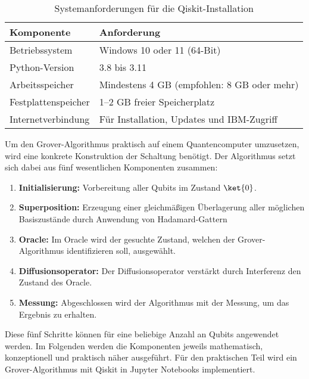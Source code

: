\begin{table}[ht!]
\centering
\begin{tabularx}{\textwidth}{|l|X|}
\hline
\textbf{Komponente} & \textbf{Anforderung} \\
\hline
Betriebssystem & Windows 10 oder 11 (64-Bit) \\
\hline
Python-Version & 3.8 bis 3.11 \\
\hline
Arbeitsspeicher & Mindestens 4 GB (empfohlen: 8 GB oder mehr) \\
\hline
Festplattenspeicher & 1–2 GB freier Speicherplatz \\
\hline
Internetverbindung & Für Installation, Updates und IBM-Zugriff \\
\hline
\end{tabularx}
\caption{Systemanforderungen für die Qiskit-Installation}
\label{tab:qiskit-anforderungen}
\end{table}

Um den Grover-Algorithmus praktisch auf einem Quantencomputer umzusetzen, wird eine konkrete Konstruktion der Schaltung benötigt. Der Algorithmus setzt sich dabei aus fünf wesentlichen Komponenten zusammen: 
\begin{enumerate}
    \item  \textbf{Initialisierung:} Vorbereitung aller Qubits im Zustand $\ket{0}$.
    \item \textbf{Superposition:} Erzeugung einer gleichmäßigen Überlagerung aller möglichen Basiszustände durch Anwendung von Hadamard-Gattern
    \item \textbf{Oracle:} Im Oracle wird der gesuchte Zustand, welchen der Grover-Algorithmus identifizieren soll, ausgewählt.
    \item \textbf{Diffusionsoperator:} Der Diffusionsoperator verstärkt durch Interferenz den Zustand des Oracle.
    \item   \textbf{Messung:} Abgeschlossen wird der Algorithmus mit der Messung, um das Ergebnis zu erhalten. 
\end{enumerate}

Diese fünf Schritte können für eine beliebige Anzahl an Qubits angewendet werden. Im Folgenden werden die Komponenten jeweils mathematisch, konzeptionell und praktisch näher ausgeführt. Für den praktischen Teil wird ein Grover-Algorithmus mit Qiskit in Jupyter Notebooks implementiert.

